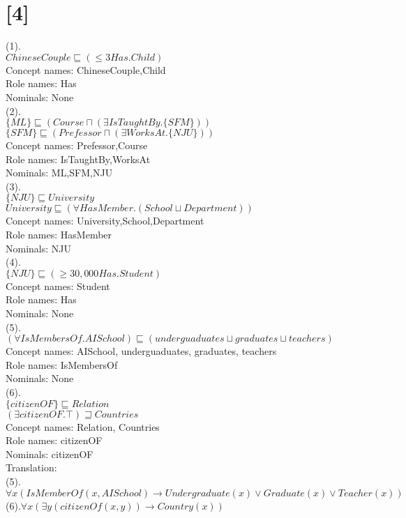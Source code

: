 \documentclass[a4paper,UTF8]{article}
\begin{document}
\section*{[4]}
(1).\\
$ChineseCouple\sqsubseteq ( \leq 3 Has.Child)$\\
Concept names: ChineseCouple,Child\\
Role names: Has\\
Nominals: None\\
(2).\\
$\{ML\}\sqsubseteq (Course\sqcap (\exists IsTaughtBy.\{SFM\})) $\\
$\{SFM\}\sqsubseteq (Prefessor \sqcap (\exists WorksAt.\{NJU\}))$\\
Concept names: Prefessor,Course\\
Role names: IsTaughtBy,WorksAt\\
Nominals: ML,SFM,NJU\\
(3).\\
$\{NJU\}\sqsubseteq University$\\
$University\sqsubseteq (\forall HasMember.(School \sqcup Department))$\\
Concept names: University,School,Department\\
Role names: HasMember\\
Nominals: NJU\\
(4).\\
$\{NJU\}\sqsubseteq (\geq 30,000 Has.Student)$\\
Concept names: Student\\
Role names: Has\\
Nominals: None\\
(5).\\
$(\forall IsMembersOf.AISchool) \sqsubseteq (underguaduates \sqcup graduates \sqcup teachers)$\\
Concept names: AISchool, underguaduates, graduates, teachers\\
Role names: IsMembersOf\\
Nominals: None\\
(6).\\
$\{citizenOF\} \sqsubseteq Relation$\\
$(\exists citizenOF.\top)\sqsupseteq Countries$\\
Concept names: Relation, Countries\\
Role names: citizenOF\\
Nominals: citizenOF\\
Translation:\\
(5).$\forall x(IsMemberOf(x, AI School) \rightarrow  Undergraduate(x) \vee  Graduate(x) \vee  Teacher(x))$\\
(6).$\forall x(\exists y(citizenOf(x, y)) \rightarrow Country(x))$
\end{document}
